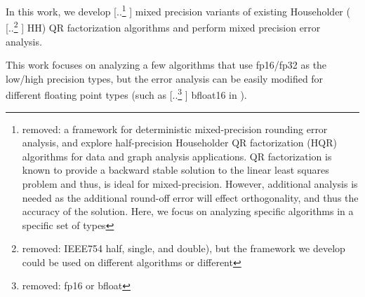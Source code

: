 \documentclass[review,onefignum,onetabnum]{siamart190516}
\providecommand{\DIFadd}[1]{{\protect\color{blue} \sf #1}} %
\providecommand{\DIFdel}[1]{{\protect\color{red} [..\footnote{removed: #1} ]}} %
\providecommand{\DIFaddbegin}{} %
\providecommand{\DIFaddend}{} %
\providecommand{\DIFdelbegin}{} %
\providecommand{\DIFdelend}{} %
\begin{document}
In this work, we develop \DIFdelbegin \DIFdel{a framework for deterministic mixed-precision rounding error analysis, and explore half-precision Householder QR factorization (HQR) algorithms for data and graph analysis applications. 
QR factorization is known to provide a backward stable solution to the linear least squares problem and thus, is ideal for mixed-precision. 
However, additional analysis is needed as the additional round-off error will effect orthogonality, and thus the accuracy of the solution. 
Here, we focus on analyzing specific algorithms in a specific set of types}\DIFdelend \DIFaddbegin \DIFadd{mixed precision variants of existing Householder }\DIFaddend (\DIFdelbegin \DIFdel{IEEE754 half, single, and double), but the framework we develop 
could be used on different algorithms or different }\DIFdelend \DIFaddbegin \DIFadd{HH) QR factorization algorithms and perform mixed precision error analysis. 
}

\DIFadd{This work focuses on analyzing a few algorithms that use fp16/fp32 as the low/high precision types, but the error analysis can be easily modified for different }\DIFaddend floating point types (such as \DIFdelbegin \DIFdel{fp16 or bfloat }\DIFdelend \DIFaddbegin \DIFadd{bfloat16 in }\DIFaddend \cite{tagliavini2018floating}).
\DIFdelbegin %
\end{document}

